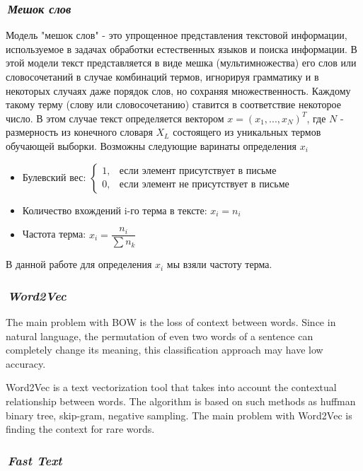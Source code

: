 \documentclass[12pt]{article}
\begin{document}
\subsubsection*{\it\,Мешок слов}
Модель "мешок слов" - это упрощенное представления текстовой информации, используемое в задачах обработки естественных языков и поиска информации. В этой модели текст представляется в виде мешка (мультимножества) его слов или словосочетаний в случае комбинаций термов, игнорируя грамматику и в некоторых случаях даже порядок слов, но сохраняя множественность. Каждому такому терму (слову или словосочетанию) ставится в соответствие некоторое число. В этом случае текст определяется вектором $x=(x_1, ..., x_N)^T$, где $N$ - размерность из конечного словаря $X_L$ состоящего из уникальных термов обучающей выборки. Возможны следующие варинаты определения $x_i$
\begin{itemize}
\item Булевский вес: $\begin{cases} 1, & \mbox{если элемент присутствует в письме} \\ 0, & \mbox{если элемент не присутствует в письме}  \end{cases}$
\item Количество вхождений i-го терма в тексте: $x_i = n_i$
\item Частота терма: $x_i = \dfrac{n_i}{\sum n_k}$
\end{itemize}

В данной работе для определения $x_i$ мы взяли частоту терма.

\subsubsection*{\it\,Word2Vec}

The main problem with BOW is the loss of context between words. Since in natural language, the permutation of even two words of a sentence can completely change its meaning, this classification approach may have low accuracy.

Word2Vec is a text vectorization tool that takes into account the contextual relationship between words. The algorithm is based on such methods as huffman binary tree, skip-gram, negative sampling. The main problem with Word2Vec is finding the context for rare words.

\subsubsection*{\it\,Fast Text}
\end{document}
